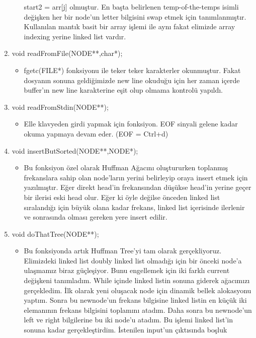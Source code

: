 \documentclass[11pt]{article}
\begin{document}
\begin{enumerate}
\begin{itemize}
		  start2 = arr[j] olmuştur. En başta belirlenen temp-of-the-temps
		  isimli değişken her bir node'un letter bilgisini swap etmek için
		  tanımlanmıştır. Kullanılan mantık basit bir array işlemi ile 
		  aynı fakat elimizde array indexing yerine linked list vardır.  
	\end{itemize}
\item void readFromFile(NODE**,char*);
	\begin{itemize}
	\item fgetc(FILE*) fonksiyonu ile teker teker karakterler okunmuştur.
		  Fakat dosyanın sonuna geldiğimizde new line okuduğu için her zaman 
		  içerde buffer'ın new line karakterine eşit olup olmama kontrolü 	 		 	  yapıldı.
	\end{itemize}
\item void readFromStdin(NODE**);
	\begin{itemize}
	\item Elle klavyeden girdi yapmak için fonksiyon. EOF sinyali gelene
		  kadar okuma yapmaya devam eder. (EOF = Ctrl+d)
	\end{itemize}
\item void insertButSorted(NODE**,NODE*);
	\begin{itemize}
	\item Bu fonksiyon özel olarak Huffman Ağacını oluştururken toplanmış
		  frekanslara sahip olan node'ların yerini belirleyip oraya insert
		  etmek için yazılmıştır. Eğer direkt head'in frekansından düşükse
		  head'in yerine geçer bir ilerisi eski head olur. Eğer ki öyle 
		  değilse önceden linked list sıralandığı için büyük olana kadar
		  frekans, linked list içerisinde ilerlenir ve sonrasında olması
		  gereken yere insert edilir.
	\end{itemize}
\item void doThatTree(NODE**);
	\begin{itemize}
	\item Bu fonksiyonda artık Huffman Tree'yi tam olarak gerçekliyoruz.
		  Elimizdeki linked list doubly linked list olmadığı için bir önceki
		  node'a ulaşmamız biraz güçleşiyor. Bunu engellemek için iki farklı 
		  current değişkeni tanımladım. While içinde linked listin sonuna
		  giderek ağacımızı gerçekledim. İlk olarak yeni oluşacak node için
		  dinamik bellek alokasyonu yaptım. Sonra bu newnode'un frekans
		  bilgisine linked listin en küçük iki elemanının frekans 
		  bilgisini toplamını atadım. Daha sonra bu newnode'un left ve right
		  bilgilerine bu iki node'u atadım. Bu işlemi linked list'in sonuna 
		  kadar gerçekleştirdim. İstenilen input'un çıktısında boşluk

\end{itemize}
\end{enumerate}
\end{document}
